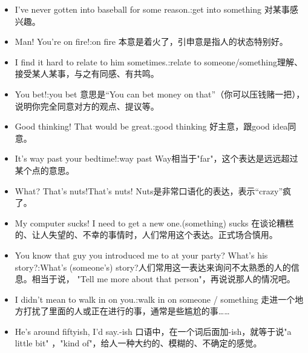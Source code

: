 \begin{itemize}
  \item I've never gotten into baseball for some reason.:get into something 对某事感兴趣。
  \item Man! You're on fire!:on fire 本意是着火了，引申意是指人的状态特别好。
  \item I find it hard to relate to him sometimes.:relate to someone/something理解、接受某人某事，与之有同感、有共鸣。
  \item You bet!:you bet 意思是“You can bet money on that”（你可以压钱赌一把），说明你完全同意对方的观点、提议等。
  \item Good thinking! That would be great.:good thinking 好主意，跟good idea同意。
  \item It's way past your bedtime!:way past Way相当于"far"，这个表达是远远超过某个点的意思。
  \item What? That's nuts!That's nuts! Nuts是非常口语化的表达，表示“crazy”疯了。
  \item My computer sucks! I need to get a new one.(something) sucks 在谈论糟糕的、让人失望的、不幸的事情时，人们常用这个表达。正式场合慎用。
  \item You know that guy you introduced me to at your party? What's his story?:What's (someone's) story?人们常用这一表达来询问不太熟悉的人的信息。相当于说， "Tell me more about that person"，再说说那人的情况吧。
  \item I didn't mean to walk in on you.:walk in on someone / something 走进一个地方打扰了里面的人或正在进行的事，通常是些尴尬的事……
  \item He's around fiftyish, I'd say.-ish 口语中，在一个词后面加-ish，就等于说"a little bit" ，"kind of"，给人一种大约的、模糊的、不确定的感觉。



\end{itemize}
